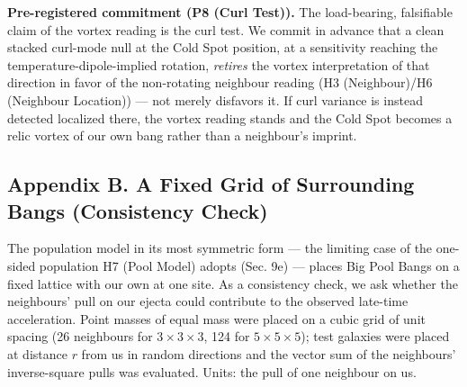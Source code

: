 \documentclass[
]{article}
\begin{document}
\textbf{Pre-registered commitment (P8 (Curl Test)).} The load-bearing,
falsifiable claim of the vortex reading is the curl test. We commit in
advance that a clean stacked curl-mode null at the Cold Spot position,
at a sensitivity reaching the temperature-dipole-implied rotation,
\emph{retires} the vortex interpretation of that direction in favor of
the non-rotating neighbour reading (H3 (Neighbour)/H6 (Neighbour
Location)) --- not merely disfavors it. If curl variance is instead
detected localized there, the vortex reading stands and the Cold Spot
becomes a relic vortex of our own bang rather than a neighbour's
imprint.

\hypertarget{appendix-b.-a-fixed-grid-of-surrounding-bangs-consistency-check}{%
\subsection{\texorpdfstring{\textbf{Appendix B. A Fixed Grid of
Surrounding Bangs (Consistency
Check)}}{Appendix B. A Fixed Grid of Surrounding Bangs (Consistency Check)}}\label{appendix-b.-a-fixed-grid-of-surrounding-bangs-consistency-check}}

The population model in its most symmetric form --- the limiting case of
the one-sided population H7 (Pool Model) adopts (Sec. 9e) --- places Big
Pool Bangs on a fixed lattice with our own at one site. As a consistency
check, we ask whether the neighbours' pull on our ejecta could
contribute to the observed late-time acceleration. Point masses of equal
mass were placed on a cubic grid of unit spacing (26 neighbours for
\(3\times3\times3\), 124 for \(5\times5\times5\)); test galaxies were
placed at distance \(r\) from us in random directions and the vector sum
of the neighbours' inverse-square pulls was evaluated. Units: the pull
of one neighbour on us.
\end{document}
